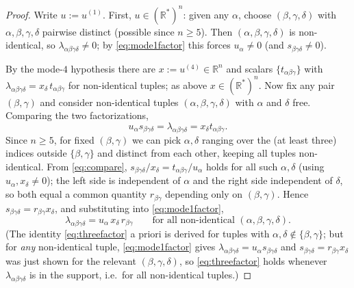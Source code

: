 \documentclass[12pt]{article}
\newcommand{\bR}{\mathbb{R}}
\theoremstyle{definition}
\begin{document}
\begin{proof}
Write $u:=u^{(1)}$.  First, $u\in(\bR^*)^n$: given any $\alpha$, choose
$(\beta,\gamma,\delta)$ with $\alpha,\beta,\gamma,\delta$ pairwise distinct (possible
since $n\ge5$).  Then $(\alpha,\beta,\gamma,\delta)$ is non-identical, so
$\lambda_{\alpha\beta\gamma\delta}\ne0$; by \eqref{eq:mode1factor} this forces
$u_\alpha\ne0$ (and $s_{\beta\gamma\delta}\ne0$).

By the mode-$4$ hypothesis there are $x:=u^{(4)}\in\bR^n$ and scalars
$\{t_{\alpha\beta\gamma}\}$ with
$\lambda_{\alpha\beta\gamma\delta}=x_\delta\,t_{\alpha\beta\gamma}$ for non-identical
tuples; as above $x\in(\bR^*)^n$.  Now fix any pair $(\beta,\gamma)$ and consider
non-identical tuples $(\alpha,\beta,\gamma,\delta)$ with $\alpha$ and $\delta$ free.
Comparing the two factorizations,
\begin{equation}\label{eq:compare}
u_\alpha s_{\beta\gamma\delta}=\lambda_{\alpha\beta\gamma\delta}=x_\delta t_{\alpha\beta\gamma}.
\end{equation}
Since $n\ge5$, for fixed $(\beta,\gamma)$ we can pick $\alpha,\delta$ ranging over
the (at least three) indices outside $\{\beta,\gamma\}$ and distinct from each other,
keeping all tuples non-identical.  From \eqref{eq:compare},
$s_{\beta\gamma\delta}/x_\delta=t_{\alpha\beta\gamma}/u_\alpha$ holds for all such
$\alpha,\delta$ (using $u_\alpha,x_\delta\ne0$); the left side is independent of
$\alpha$ and the right side independent of $\delta$, so both equal a common quantity
$r_{\beta\gamma}$ depending only on $(\beta,\gamma)$.  Hence
$s_{\beta\gamma\delta}=r_{\beta\gamma}x_\delta$, and substituting into
\eqref{eq:mode1factor},
\begin{equation}\label{eq:threefactor}
\lambda_{\alpha\beta\gamma\delta}=u_\alpha\,x_\delta\,r_{\beta\gamma}
\qquad\text{for all non-identical }(\alpha,\beta,\gamma,\delta).
\end{equation}
(The identity \eqref{eq:threefactor} a priori is derived for tuples with
$\alpha,\delta\notin\{\beta,\gamma\}$; but for \emph{any} non-identical tuple,
\eqref{eq:mode1factor} gives $\lambda_{\alpha\beta\gamma\delta}=u_\alpha
s_{\beta\gamma\delta}$ and $s_{\beta\gamma\delta}=r_{\beta\gamma}x_\delta$ was just
shown for the relevant $(\beta,\gamma,\delta)$, so \eqref{eq:threefactor} holds
whenever $\lambda_{\alpha\beta\gamma\delta}$ is in the support, i.e.\ for all
non-identical tuples.)


\end{proof}
\end{document}
